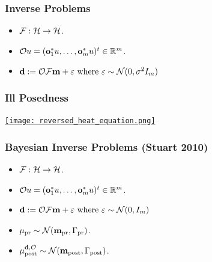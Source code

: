 \documentclass{beamer}
\begin{document}
\begin{frame}
\frametitle{Inverse Problems}

\begin{itemize}
  \item<1-> \(\mathcal{F}: \mathcal{H} \to \mathcal{H}\). 
  \item<2-> \(\mathcal{O} u = (\mathbf{o}_1^*u, \dots, \mathbf{o}_m^*u )^t \in \mathbb{R}^m\).
  \item<3-> \(\mathbf{d} := \mathcal{O} \mathcal{F} \mathbf{m} + \varepsilon \text{ where } \varepsilon \sim \mathcal{N}(0,\sigma^2 I_m)\)
\end{itemize}


\end{frame}


\begin{frame}
  \frametitle{Ill Posedness}
    \href{run:reversed_heat_equation.mp4}{\texttt{[image: reversed\_heat\_equation.png]}}    
\end{frame}


\begin{frame}
\frametitle{Bayesian Inverse Problems (Stuart 2010)}
\begin{itemize}
\item \(\mathcal{F}: \mathcal{H} \to \mathcal{H}\). 
\item \(\mathcal{O} u = (\mathbf{o}_1^*u, \dots, \mathbf{o}_m^*u )^t \in \mathbb{R}^m\).
\item \(\mathbf{d} := \mathcal{O} \mathcal{F} \mathbf{m} + \varepsilon \text{ where } \varepsilon \sim \mathcal{N}(0,I_m)\)
\item \(\mu_{\textup{pr}} \sim \mathcal{N}(\mathbf{m}_{\textup{pr}}, \Gamma_{\textup{pr}})\).
\item \(\mu_{\textup{post}}^{\mathbf{d}, \mathcal{O}} \sim \mathcal{N}(\mathbf{m}_{\textup{post}}, \Gamma_{\textup{post}})\).
\end{itemize}

\end{frame}
\end{document}
